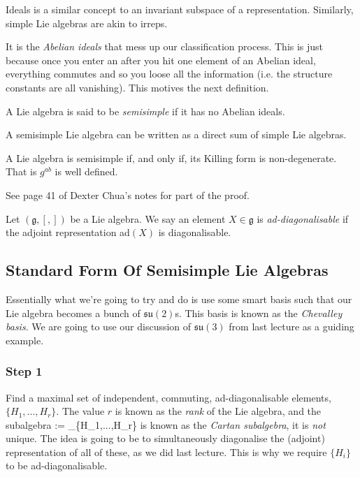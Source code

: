 \br 
    Ideals is a similar concept to an invariant subspace of a representation. Similarly, simple Lie algebras are akin to irreps. 
\er 

It is the \textit{Abelian ideals} that mess up our classification process. This is just because once you enter an after you hit one element of an Abelian ideal, everything commutes and so you loose all the information (i.e. the structure constants are all vanishing). This motives the next definition. 

    A Lie algebra is said to be \textit{semisimple} if it has no Abelian ideals.
\ed 

\bt 
    A semisimple Lie algebra can be written as a direct sum of simple Lie algebras. 
\et 

\bt[Cartan]
    A Lie algebra is semisimple if, and only if, its Killing form is non-degenerate. That is $g^{ab}$ is well defined. 
\et 

\bq 
    See page 41 of Dexter Chua's notes for part of the proof.
\eq 

\bd[Ad-Diagonalisable]
    Let $(\mathfrak{g},[,])$ be a Lie algebra. We say an element $X\in\mathfrak{g}$ is \textit{ad-diagonalisable} if the adjoint representation ad$(X)$ is diagonalisable.
\ed 

\subsection{Standard Form Of Semisimple Lie Algebras}

Essentially what we're going to try and do is use some smart basis such that our Lie algebra becomes a bunch of $\mathfrak{su}(2)$s. This basis is known as the \textit{Chevalley basis}. We are going to use our discussion of $\mathfrak{su}(3)$ from last lecture as a guiding example. 

\subsubsection{Step 1}
Find a maximal set of independent, commuting, ad-diagonalisable elements, $\{H_1,...,H_r\}$. The value $r$ is known as the \textit{rank} of the Lie algebra, and the subalgebra 
\be 
\label{eqn:CartanSubalgebra}
     := _{\C}\{H_1,...,H_r\}
\ee 
is known as the \textit{Cartan subalgebra}, it is \textit{not} unique. The idea is going to be to simultaneously diagonalise the (adjoint) representation of all of these, as we did last lecture. This is why we require $\{H_i\}$ to be ad-diagonalisable.

